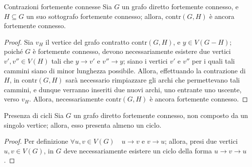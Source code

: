 \documentclass[a4paper, 12pt]{report}
\begin{document}
    \begin{framedthm}{Contrazioni fortemente connesse}
        \label{contrazioni fortemente connesse}
        Sia $G$ un grafo diretto fortemente connesso, e $H \subseteq G$ un suo sottografo fortemente connesso; allora, $\mathrm{contr}(G, H)$ è ancora fortemente connesso.
    \end{framedthm}

    \begin{proof}
        Sia $v_H$ il vertice del grafo contratto $\mathrm{contr}(G, H)$, e $y \in V(G - H)$; poiché $G$ è fortemente connesso, devono necessariamente esistere due vertici $v', v'' \in V(H)$ tali che $y \rightarrow v'$ e $v'' \rightarrow y$; siano i vertici $v'$ e $v''$ per i quali tali cammini siano di minor lunghezza possibile. Allora, effettuando la contrazione di $H$, in $\mathrm{contr}(G, H)$ sarà necessario rimpiazzare gli archi che permettevano tali cammini, e dunque verranno inseriti due nuovi archi, uno entrante uno uscente, verso $v_H$. Allora, necessariamente $\mathrm{contr}(G, H)$ è ancora fortemente connesso.
    \end{proof}

    \begin{framedthm}{Presenza di cicli}
        \label{presenza di cicli fort conn}
        Sia $G$ un grafo diretto fortemente connesso, non composto da un singolo vertice; allora, esso presenta almeno un ciclo.
    \end{framedthm}

    \begin{proof}
        Per definizione $\forall u, v \in V(G) \quad u \rightarrow v$ e $v \rightarrow u$; allora, presi due vertici $u, v \in V(G)$, in $G$ deve necessariamente esistere un ciclo della forma $u \rightarrow v \rightarrow u$.
    \end{proof}
\end{document}
